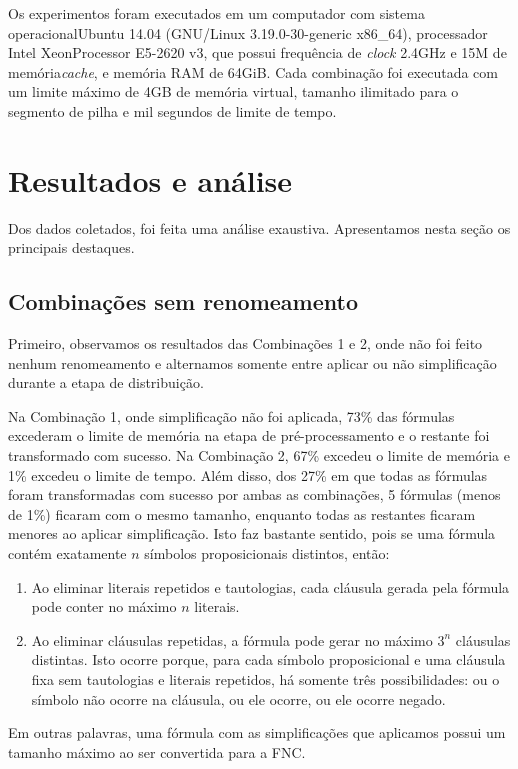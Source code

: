 Os experimentos foram executados em um computador com sistema operacional\break Ubuntu 14.04 (GNU/Linux 3.19.0-30-generic x86\_64), processador Intel\textsuperscript{\textregistered} Xeon\textsuperscript{\textregistered}\break Processor E5-2620 v3, que possui frequência de \textit{clock} 2.4GHz e 15M de memória\break \textit{cache}, e memória RAM de 64GiB. Cada combinação foi executada com um limite máximo de 4GB de memória virtual, tamanho ilimitado para o segmento de pilha e mil segundos de limite de tempo.

\section{Resultados e análise}

\indent

Dos dados coletados, foi feita uma análise exaustiva. Apresentamos nesta seção os principais destaques.

\subsection{Combinações sem renomeamento}

\indent

Primeiro, observamos os resultados das Combinações 1 e 2, onde não foi feito nenhum renomeamento e alternamos somente entre aplicar ou não simplificação durante a etapa de distribuição.

Na Combinação 1, onde simplificação não foi aplicada, 73\% das fórmulas excederam o limite de memória na etapa de pré-processamento e o restante foi transformado com sucesso. Na Combinação 2, 67\% excedeu o limite de memória e 1\% excedeu o limite de tempo. Além disso, dos 27\% em que todas as fórmulas foram transformadas com sucesso por ambas as combinações, 5 fórmulas (menos de 1\%) ficaram com o mesmo tamanho, enquanto todas as restantes ficaram menores ao aplicar simplificação. Isto faz bastante sentido, pois se uma fórmula contém exatamente $n$ símbolos proposicionais distintos, então:
\begin{enumerate}
	\item Ao eliminar literais repetidos e tautologias, cada cláusula gerada pela fórmula pode conter no máximo $n$ literais.
	\item Ao eliminar cláusulas repetidas, a fórmula pode gerar no máximo $3^n$ cláusulas distintas. Isto ocorre porque, para cada símbolo proposicional e uma cláusula fixa sem tautologias e literais repetidos, há somente três possibilidades: ou o símbolo não ocorre na cláusula, ou ele ocorre, ou ele ocorre negado.
\end{enumerate}
Em outras palavras, uma fórmula com as simplificações que aplicamos possui um tamanho máximo ao ser convertida para a FNC.


